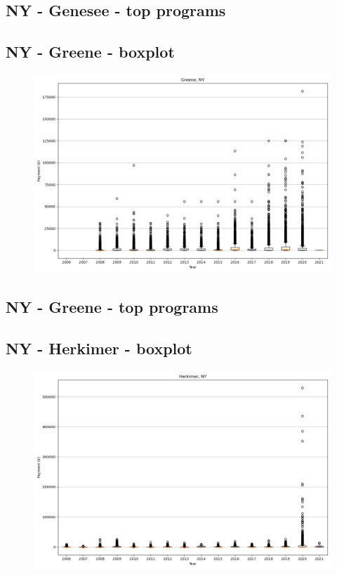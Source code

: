 \subsection*{NY - Genesee - top programs}

\newpage
\subsection*{NY - Greene - boxplot}
\begin{figure}[h]
\centering
\includegraphics[width=7in]{../output/boxplots/counties/Greene-NY_boxplot.png}
\end{figure}


\subsection*{NY - Greene - top programs}

\newpage
\subsection*{NY - Herkimer - boxplot}
\begin{figure}[h]
\centering
\includegraphics[width=7in]{../output/boxplots/counties/Herkimer-NY_boxplot.png}
\end{figure}


